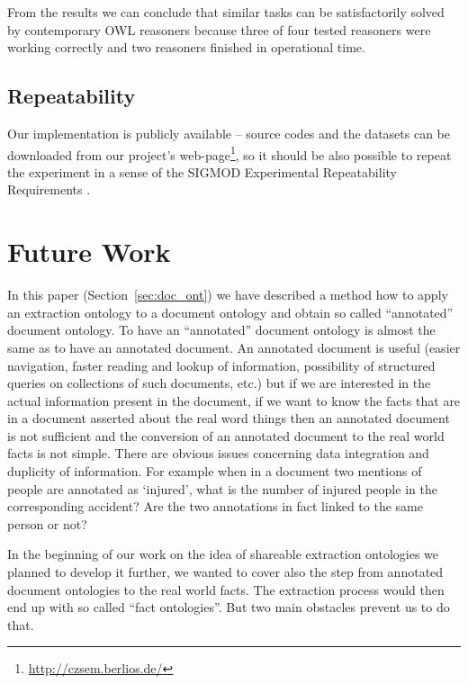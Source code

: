 \documentclass[10pt, conference, compsocconf]{IEEEtran}
\begin{document}
From the results we can conclude that similar tasks can be satisfactorily solved by contemporary OWL reasoners because three of four tested reasoners were working correctly and two reasoners finished in operational time.






\subsection{Repeatability}

Our implementation is publicly available -- source codes and the datasets can be downloaded from our project's web-page\footnote{\url{http://czsem.berlios.de/}}, so it should be also possible to repeat the experiment in a sense of  the SIGMOD Experimental Repeatability Requirements \cite{biblio:SIGMODrepeatability}.

\section{Future Work}


In this paper (Section~\ref{sec:doc_ont}) we have described a method how to apply an extraction ontology to a document ontology and obtain so called ``annotated'' document ontology. To have an ``annotated'' document ontology is almost the same as to have an annotated document. An annotated document is useful (easier navigation, faster reading and lookup of information, possibility of structured queries on collections of such documents, etc.) but if we are interested in the actual information present in the document, if we want to know the facts that are in a document asserted about the real word things then an annotated document is not sufficient and the conversion of an annotated document to the real world facts is not simple.
There are obvious issues concerning data integration and duplicity of information. For example when in a document two mentions of people are annotated as `injured', what is the number of injured people in the corresponding accident? Are the two annotations in fact linked to the same person or not?

In the beginning of our work on the idea of shareable extraction ontologies we planned to develop it further, we wanted to cover also the step from annotated document ontologies to the real world facts. The extraction process would then end up with so called ``fact ontologies''. But two main obstacles prevent us to do that.
\end{document}
